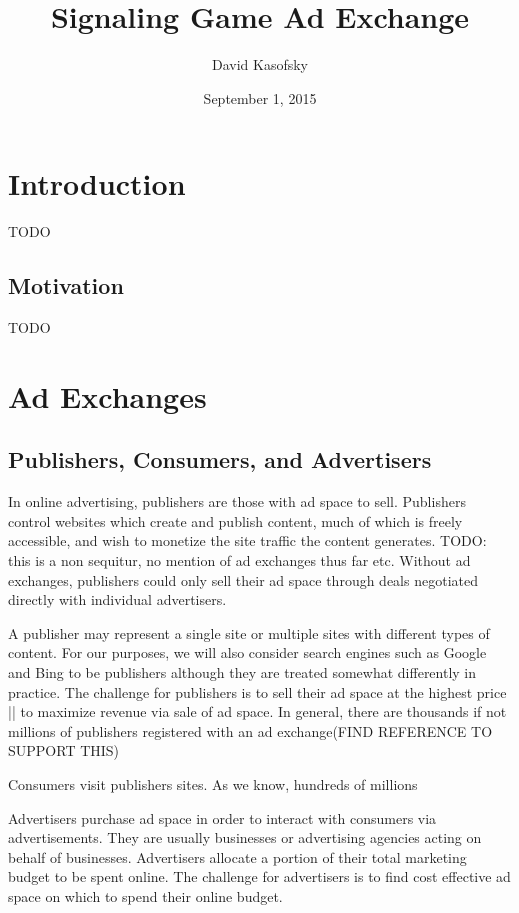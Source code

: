 \documentclass{article}
\title{Signaling Game Ad Exchange}
\author{David Kasofsky}
\date{September 1, 2015}
\begin{document}
\maketitle

\newpage

\tableofcontents

\newpage

\section{Introduction}

TODO

\subsection{Motivation}

TODO

\newpage

\section{Ad Exchanges}

\subsection{Publishers, Consumers, and Advertisers}

In online advertising, publishers are those with ad space to sell. Publishers control websites which create and publish content, much of which is freely accessible, and wish to monetize the site traffic the content generates. TODO: this is a non sequitur, no mention of ad exchanges thus far etc. Without ad exchanges, publishers could only sell their ad space through deals negotiated directly with individual advertisers.

A publisher may represent a single site or multiple sites with different types of content. For our purposes, we will also consider search engines such as Google and Bing to be publishers although they are treated somewhat differently in practice. The challenge for publishers is to sell their ad space at the highest price || to maximize revenue via sale of ad space. In general, there are thousands if not millions of publishers registered with an ad exchange(FIND REFERENCE TO SUPPORT THIS)

Consumers visit publishers sites. As we know, hundreds of millions 

Advertisers purchase ad space in order to interact with consumers via advertisements. They are usually businesses or advertising agencies acting on behalf of businesses. Advertisers allocate a portion of their total marketing budget to be spent online. The challenge for advertisers is to find cost effective ad space on which to spend their online budget. 
\end{document}
